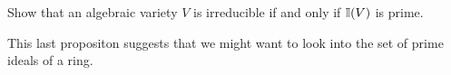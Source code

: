 \documentclass{ximera}
\begin{document}
\begin{proposition}%
  Show that an algebraic variety $V$ is irreducible if and only if
  $\mathbb I(V)$ is prime.
    
\end{proposition}










This last propositon suggests that we might want to look into the set
of prime ideals of a ring.
\end{document}
